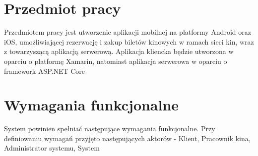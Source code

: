 \section{Przedmiot pracy}
Przedmiotem pracy jest utworzenie aplikacji mobilnej na platformy Android oraz iOS, umożliwiającej rezerwację i zakup biletów kinowych w ramach sieci kin, wraz z towarzyszącą aplikacją serwerową. Aplikacja kliencka będzie utworzona w oparciu o platformę Xamarin, natomiast aplikacja serwerowa w oparciu o framework ASP.NET Core
\section{Wymagania funkcjonalne}
System powinien spełniać następujące wymagania funkcjonalne. Przy definiowaniu wymagań przyjęto następujących aktorów - Klient, Pracownik kina, Administrator systemu, System
